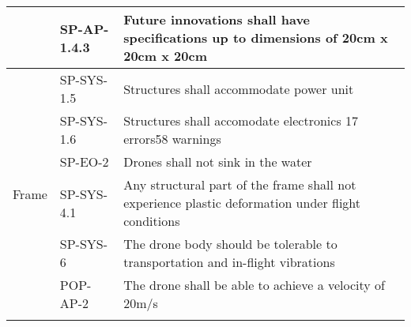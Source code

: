 \begin{table}[H]
\begin{scriptsize}
\begin{tabular}{|p{2cm}|p{2cm}|p{10cm}|}
                          & SP-AP-1.4.3   & Future innovations shall have specifications up to dimensions of 20cm x 20cm x 20cm                                          \\ \hline
\multirow{15}{*}{Frame}   & SP-SYS-1.5    & Structures shall accommodate power unit                                                                                      \\\cline{2-3} 
                          & SP-SYS-1.6  & Structures shall accomodate electronics                                                       
17 errors58 warnings
                               \\\cline{2-3} 
                          & SP-EO-2       & Drones shall not sink in the water                                                                                           \\\cline{2-3} 
                          & SP-SYS-4.1    & Any structural part of the frame shall not experience plastic deformation under flight conditions                            \\\cline{2-3} 
                          & SP-SYS-6      & The drone body should be tolerable to transportation and in-flight vibrations                                                \\\cline{2-3} 
                          & POP-AP-2      & The drone shall be able to achieve a velocity of 20m/s                                                                       \\\cline{2-3} 
                          

\end{tabular}
\end{scriptsize}
\end{table}
